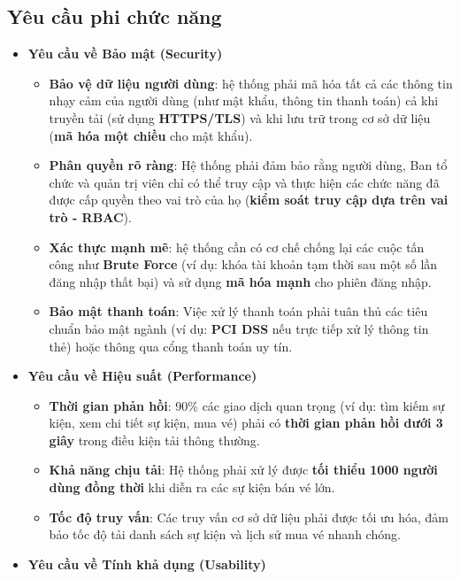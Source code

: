 \subsection{Yêu cầu phi chức năng}
\begin{itemize}
    \item[\textbf{-}] \textbf{Yêu cầu về Bảo mật (Security)}
        \begin{itemize}
            \item[+] \textbf{Bảo vệ dữ liệu người dùng}: hệ thống phải mã hóa tất cả các thông tin nhạy cảm của người dùng (như mật khẩu, thông tin thanh toán) cả khi truyền tải (sử dụng \textbf{HTTPS/TLS}) và khi lưu trữ trong cơ sở dữ liệu (\textbf{mã hóa một chiều} cho mật khẩu).
            \item[+] \textbf{Phân quyền rõ ràng}: Hệ thống phải đảm bảo rằng người dùng, Ban tổ chức và quản trị viên chỉ có thể truy cập và thực hiện các chức năng đã được cấp quyền theo vai trò của họ (\textbf{kiểm soát truy cập dựa trên vai trò - RBAC}).
            \item[+] \textbf{Xác thực mạnh mẽ}: hệ thống cần có cơ chế chống lại các cuộc tấn công như \textbf{Brute Force} (ví dụ: khóa tài khoản tạm thời sau một số lần đăng nhập thất bại) và sử dụng \textbf{mã hóa mạnh} cho phiên đăng nhập.
            \item[+] \textbf{Bảo mật thanh toán}: Việc xử lý thanh toán phải tuân thủ các tiêu chuẩn bảo mật ngành (ví dụ: \textbf{PCI DSS} nếu trực tiếp xử lý thông tin thẻ) hoặc thông qua cổng thanh toán uy tín.
        \end{itemize}
    \item[\textbf{-}] \textbf{Yêu cầu về Hiệu suất (Performance)}
        \begin{itemize}
            \item[+] \textbf{Thời gian phản hồi}: 90\% các giao dịch quan trọng (ví dụ: tìm kiếm sự kiện, xem chi tiết sự kiện, mua vé) phải có \textbf{thời gian phản hồi dưới 3 giây} trong điều kiện tải thông thường.
            \item[+] \textbf{Khả năng chịu tải}: Hệ thống phải xử lý được \textbf{tối thiểu 1000 người dùng đồng thời} khi diễn ra các sự kiện bán vé lớn.
            \item[+] \textbf{Tốc độ truy vấn}: Các truy vấn cơ sở dữ liệu phải được tối ưu hóa, đảm bảo tốc độ tải danh sách sự kiện và lịch sử mua vé nhanh chóng.
        \end{itemize}
    \item[\textbf{-}] \textbf{Yêu cầu về Tính khả dụng (Usability)}

\end{itemize}
